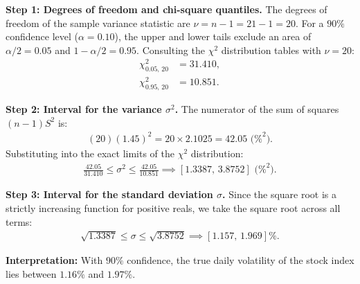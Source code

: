 \begin{solproblema}
	\textbf{Step 1: Degrees of freedom and chi-square quantiles.}
	The degrees of freedom of the sample variance statistic are $\nu = n - 1 = 21 - 1 = 20$.
	For a $90\%$ confidence level ($\alpha = 0.10$), the upper and lower tails exclude an area of $\alpha/2 = 0.05$ and $1-\alpha/2 = 0.95$. Consulting the $\chi^2$ distribution tables with $\nu = 20$:
	\begin{align}
		\chi^2_{0.05, \, 20} &= 31.410, \\
		\chi^2_{0.95, \, 20} &= 10.851.
	\end{align}
	
	\textbf{Step 2: Interval for the variance $\sigma^2$.}
	The numerator of the sum of squares $(n-1)S^2$ is:
	\begin{align}
		(20)(1.45)^2 = 20 \times 2.1025 = 42.05 \text{ (\%}^2\text{).}
	\end{align}
	Substituting into the exact limits of the $\chi^2$ distribution:
	\begin{align}
		\frac{42.05}{31.410} \le \sigma^2 \le \frac{42.05}{10.851} \implies [1.3387, \, 3.8752] \text{ (\%}^2\text{).}
	\end{align}
	
	\textbf{Step 3: Interval for the standard deviation $\sigma$.}
	Since the square root is a strictly increasing function for positive reals, we take the square root across all terms:
	\begin{align}
		\sqrt{1.3387} \le \sigma \le \sqrt{3.8752} \implies [1.157, \, 1.969] \%.
	\end{align}
	
	\textbf{Interpretation:} With $90\%$ confidence, the true daily volatility of the stock index lies between $1.16\%$ and $1.97\%$.
\end{solproblema}


